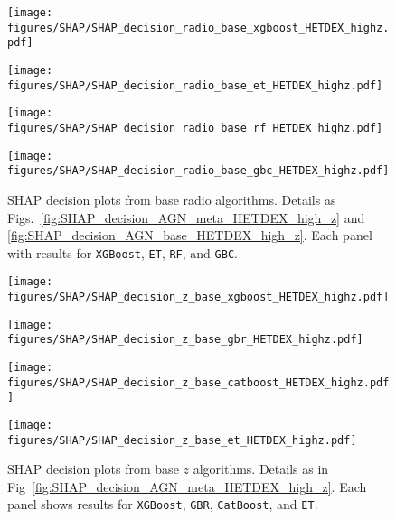 \documentclass{aa}
\begin{document}
\begin{appendix}
\begin{figure}
  \centering
  \begin{minipage}{0.44\columnwidth}
    \centering
    \texttt{[image: figures/SHAP/SHAP\_decision\_radio\_base\_xgboost\_HETDEX\_highz.pdf]}
  \end{minipage}%
  \hfill
  \begin{minipage}{0.44\columnwidth}
    \centering
    \texttt{[image: figures/SHAP/SHAP\_decision\_radio\_base\_et\_HETDEX\_highz.pdf]}
  \end{minipage}\break%
  \begin{minipage}{0.44\columnwidth}
    \centering
    \texttt{[image: figures/SHAP/SHAP\_decision\_radio\_base\_rf\_HETDEX\_highz.pdf]}
  \end{minipage}%
  \hfill
  \begin{minipage}{0.44\columnwidth}
    \centering
    \texttt{[image: figures/SHAP/SHAP\_decision\_radio\_base\_gbc\_HETDEX\_highz.pdf]}
  \end{minipage}
  \caption{SHAP decision plots from base radio algorithms. Details as Figs.~\ref{fig:SHAP_decision_AGN_meta_HETDEX_high_z} and \ref{fig:SHAP_decision_AGN_base_HETDEX_high_z}. Each panel with results for \texttt{XGBoost}, \texttt{ET}, \texttt{RF}, and \texttt{GBC}.}
  \label{fig:SHAP_decision_radio_base_HETDEX_high_z}
\end{figure}

\begin{figure}
  \centering
  \begin{minipage}{0.44\columnwidth}
    \centering
    \texttt{[image: figures/SHAP/SHAP\_decision\_z\_base\_xgboost\_HETDEX\_highz.pdf]}
  \end{minipage}%
  \hfill
  \begin{minipage}{0.44\columnwidth}
    \centering
    \texttt{[image: figures/SHAP/SHAP\_decision\_z\_base\_gbr\_HETDEX\_highz.pdf]}
  \end{minipage}\break%
  \begin{minipage}{0.44\columnwidth}
    \centering
    \texttt{[image: figures/SHAP/SHAP\_decision\_z\_base\_catboost\_HETDEX\_highz.pdf]}
  \end{minipage}%
  \hfill
  \begin{minipage}{0.44\columnwidth}
    \centering
    \texttt{[image: figures/SHAP/SHAP\_decision\_z\_base\_et\_HETDEX\_highz.pdf]}
  \end{minipage}
  \caption{SHAP decision plots from base $z$ algorithms. Details as in Fig~\ref{fig:SHAP_decision_AGN_meta_HETDEX_high_z}. Each panel shows results for \texttt{XGBoost}, \texttt{GBR}, \texttt{CatBoost}, and \texttt{ET}.}
  \label{fig:SHAP_decision_z_base_HETDEX_high_z}
\end{figure}


\end{appendix}
\end{document}
